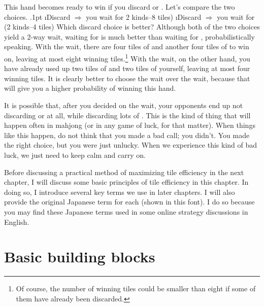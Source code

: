 \bigskip
\noindent
This hand becomes ready to win if you discard {} or {}. Let's compare the two choices.
\bi\itemsep.1pt
\i Discard {} $\Rightarrow$ you wait for { \mahjong[15pt]{8p]}} 2 kinds--8 tiles)
\i Discard {} $\Rightarrow$ you wait for { \mahjong[15pt]{6p]}} (2 kinds--4 tiles)
\ei
Which discard choice is better? Although both of the two choices yield a 2-way wait, waiting for { \mahjong[15pt]{8p]}} is much better than waiting for { \mahjong[15pt]{6p]}}, probabilistically speaking. With the { \mahjong[15pt]{8p]}} wait, there are four tiles of {} and another four tiles of {} to win on, leaving at most eight winning tiles.\footnote{Of course, the number of winning tiles could be smaller than eight if some of them have already been discarded.} 
With the { \mahjong[15pt]{6p]}} wait, on the other hand, you have already used up two tiles of {} and two tiles of {} yourself, leaving at most four winning tiles. It is clearly better to choose the { \mahjong[15pt]{8p]}} wait over the { \mahjong[15pt]{6p]}} wait, because that will give you a higher probability of winning this hand. 

\bigskip
It is possible that, after you decided on the { \mahjong[15pt]{8p]}} wait, your opponents end up not discarding {} or {} at all, while discarding lots of { \mahjong[15pt]{6p]}}. This is the kind of thing that will happen often in mahjong (or in any game of luck, for that matter). When things like this happen, do not think that you made a bad call; you didn't. You made the right choice, but you were just unlucky. When we experience this kind of bad luck, we just need to keep calm and carry on.

\bigskip
Before discussing a practical method of maximizing tile efficiency in the next chapter, I will discuss some basic principles of tile efficiency in this chapter. In doing so, I introduce several key terms we use in later chapters. I will also provide the original Japanese term for each (shown in {\jap this font}). I do so because you may find these Japanese terms used in some online strategy discussions in English.

\section{Basic building blocks}

